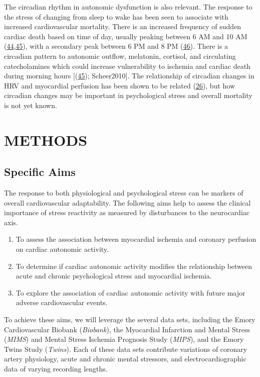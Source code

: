 \documentclass[
  11pt,
  openany]{book}
\providecommand{\tightlist}{%
  \setlength{\itemsep}{0pt}\setlength{\parskip}{0pt}}
\begin{document}
The circadian rhythm in autonomic dysfunction is also relevant. The response to the stress of changing from sleep to wake has been seen to associate with increased cardiovascular mortality.
There is an increased frequency of sudden cardiac death based on time of day, usually peaking between 6 AM and 10 AM (\protect\hyperlink{ref-Muller1999}{44},\protect\hyperlink{ref-Boudreau2011}{45}), with a secondary peak between 6 PM and 8 PM (\protect\hyperlink{ref-Mulcahy1988}{46}).
There is a circadian pattern to autonomic outflow, melatonin, cortisol, and circulating catecholamines which could increase vulnerability to ischemia and cardiac death during morning hours {[}(\protect\hyperlink{ref-Boudreau2011}{45}); Scheer2010{]}.
The relationship of circadian changes in HRV and myocardial perfusion has been shown to be related (\protect\hyperlink{ref-Shah2020}{26}), but how circadian changes may be important in psychological stress and overall mortality is not yet known.

\hypertarget{part-methods}{%
\part*{METHODS}\label{part-methods}}

\hypertarget{aims}{%
\chapter{Specific Aims}\label{aims}}

The response to both physiological and psychological stress can be markers of overall cardiovascular adaptability. The following aims help to assess the clinical importance of stress reactivity as measured by disturbances to the neurocardiac axis.

\begin{enumerate}
\def\labelenumi{\arabic{enumi}.}
\tightlist
\item
  To assess the association between myocardial ischemia and coronary perfusion on cardiac autonomic activity.
\item
  To determine if cardiac autonomic activity modifies the relationship between acute and chronic psychological stress and myocardial ischemia.
\item
  To explore the association of cardiac autonomic activity with future major adverse cardiovascular events.
\end{enumerate}

To achieve these aims, we will leverage the several data sets, including the Emory Cardiovascular Biobank (\emph{Biobank}), the Myocardial Infarction and Mental Stress (\emph{MIMS}) and Mental Stress Ischemia Prognosis Study (\emph{MIPS}), and the Emory Twins Study (\emph{Twins}). Each of these data sets contribute variations of coronary artery physiology, acute and chronic mental stressors, and electrocardiographic data of varying recording lengths.
\end{document}
